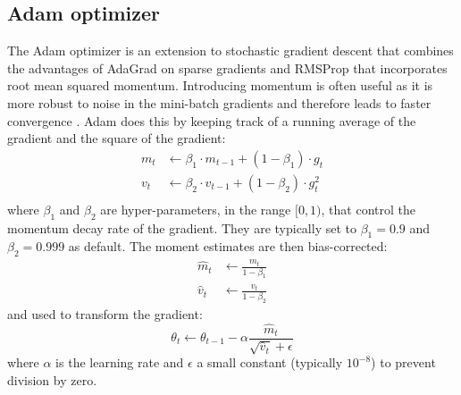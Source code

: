 \documentclass[a4paper,11pt]{article} %
\begin{document}
\subsection{Adam optimizer}
The Adam optimizer \cite{kingma2014adam} is an extension to stochastic gradient descent that combines the advantages of AdaGrad \cite{duchi2011adaptive} on sparse gradients and RMSProp \cite{hinton2012rmsprop} that incorporates root mean squared momentum. Introducing momentum is often useful as it is more robust to noise in the mini-batch gradients and therefore leads to faster convergence \cite{QIAN1999145}. Adam does this by keeping track of a running average of the gradient and the square of the gradient:
\begin{equation}
  \begin{split}
    m_t &\leftarrow \beta_1 \cdot m_{t-1} + (1-\beta_1) \cdot g_t \\
    v_t &\leftarrow \beta_2 \cdot v_{t-1} + (1-\beta_2) \cdot g_t^2 \\
  \end{split}
\end{equation}
where $\beta_1$ and $\beta_2$ are hyper-parameters, in the range $[0, 1)$, that control the momentum decay rate of the gradient. They are typically set to $\beta_1 = 0.9$ and $\beta_2 = 0.999$ as default. The moment estimates are then bias-corrected:
\begin{equation}
  \begin{split}
    \hat{m}_t &\leftarrow  \frac{m_t}{1-\beta_1} \\
    \hat{v}_t &\leftarrow \frac{v_t}{1-\beta_2}
  \end{split}
\end{equation}
and used to transform the gradient:
\begin{equation}
  \theta_t \leftarrow \theta_{t-1} - \alpha \frac{\hat{m}_t}{\sqrt{\hat{v}_t} + \epsilon}
\end{equation}
where $\alpha$ is the learning rate and $\epsilon$ a small constant (typically $10^{-8}$) to prevent division by zero. 

\end{document}
